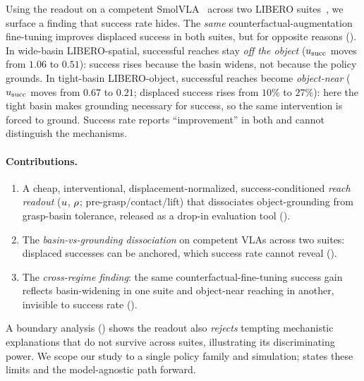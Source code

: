 Using the readout on a competent SmolVLA~\citep{smolvla2025} across two LIBERO
suites~\citep{liu2023libero}, we surface a finding that success rate hides. The
\emph{same} counterfactual-augmentation fine-tuning improves displaced success in both
suites, but for opposite reasons (). In wide-basin LIBERO-spatial,
successful reaches stay \emph{off the object} ($u_{\mathrm{succ}}$ moves from $1.06$ to $0.51$):
success rises because the basin widens, not because the policy grounds. In tight-basin
LIBERO-object, successful reaches become \emph{object-near} ($u_{\mathrm{succ}}$ moves from $0.67$ to
$0.21$; displaced success rises from $10\%$ to $27\%$): here the tight basin makes
grounding necessary for success, so the same intervention is forced to ground. Success
rate reports ``improvement'' in both and cannot distinguish the mechanisms.

\paragraph{Contributions.}
\begin{enumerate}[topsep=2pt,itemsep=1pt,leftmargin=1.4em]
\item A cheap, interventional, displacement-normalized, success-conditioned \emph{reach
readout} ($u$, $\rho$; pre-grasp/contact/lift) that dissociates object-grounding from
grasp-basin tolerance, released as a drop-in evaluation tool ().
\item The \emph{basin-vs-grounding dissociation} on competent VLAs across two suites:
displaced successes can be anchored, which success rate cannot reveal ().
\item The \emph{cross-regime finding}: the same counterfactual-fine-tuning success gain
reflects basin-widening in one suite and object-near reaching in another, invisible to
success rate ().
\end{enumerate}
A boundary analysis () shows the readout also \emph{rejects} tempting
mechanistic explanations that do not survive across suites, illustrating its
discriminating power. We scope our study to a single policy family and simulation;
 states these limits and the model-agnostic path forward.
